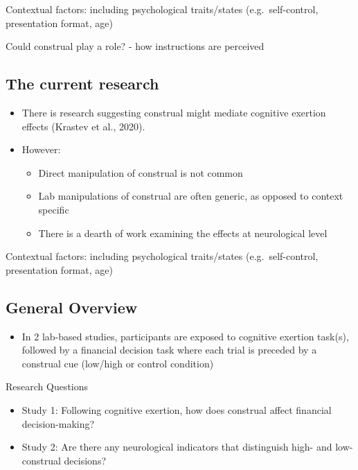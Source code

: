 \documentclass[
  letterpaper,
  DIV=11,
  numbers=noendperiod]{scrartcl}
\providecommand{\tightlist}{%
  \setlength{\itemsep}{0pt}\setlength{\parskip}{0pt}}\usepackage{longtable,booktabs,array}
\begin{document}
Contextual factors: including psychological traits/states
(e.g.~self-control, presentation format, age)

Could construal play a role? - how instructions are perceived

\hypertarget{the-current-research}{%
\subsection{The current research}\label{the-current-research}}

\begin{itemize}
\item
  There is research suggesting construal might mediate cognitive
  exertion effects (Krastev et al., 2020).
\item
  However:

  \begin{itemize}
  \tightlist
  \item
    Direct manipulation of construal is not common
  \item
    Lab manipulations of construal are often generic, as opposed to
    context specific
  \item
    There is a dearth of work examining the effects at neurological
    level
  \end{itemize}
\end{itemize}

Contextual factors: including psychological traits/states
(e.g.~self-control, presentation format, age)

\hypertarget{general-overview}{%
\subsection{General Overview}\label{general-overview}}

\begin{itemize}
\tightlist
\item
  In 2 lab-based studies, participants are exposed to cognitive exertion
  task(s), followed by a financial decision task where each trial is
  preceded by a construal cue (low/high or control condition)
\end{itemize}

Research Questions

\begin{itemize}
\item
  Study 1: Following cognitive exertion, how does construal affect
  financial decision-making?
\item
  Study 2: Are there any neurological indicators that distinguish high-
  and low-construal decisions?
\end{itemize}
\end{document}
